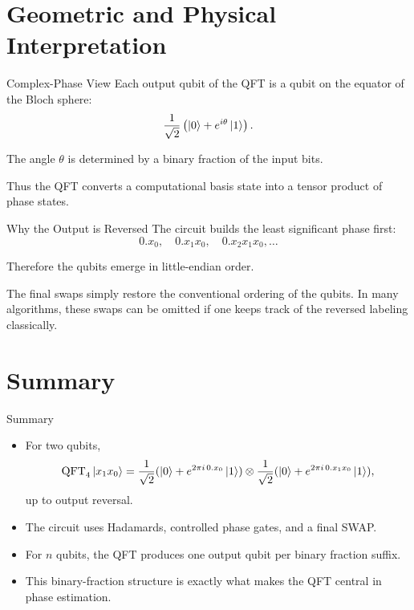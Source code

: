 \documentclass{beamer}
\begin{document}
\section{Geometric and Physical Interpretation}

\begin{frame}{Complex-Phase View}
Each output qubit of the QFT is a qubit on the equator of the Bloch sphere:
\[
\frac{1}{\sqrt{2}}
\left(
\ket{0}+e^{i\theta}\ket{1}
\right).
\]

The angle \(\theta\) is determined by a binary fraction of the input bits.

Thus the QFT converts a computational basis state into a tensor product of phase states.
\end{frame}


\begin{frame}{Why the Output is Reversed}
The circuit builds the least significant phase first:
\[
0.x_0,\quad 0.x_1x_0,\quad 0.x_2x_1x_0,\dots
\]

Therefore the qubits emerge in little-endian order.

The final swaps simply restore the conventional ordering of the qubits. In many algorithms, these swaps can be omitted if one keeps track of the reversed labeling classically.
\end{frame}

\section{Summary}

\begin{frame}{Summary}
\begin{itemize}
\item For two qubits,
\[
\mathrm{QFT}_4\ket{x_1x_0}
=
\frac{1}{\sqrt{2}}
(\ket{0}+e^{2\pi i\,0.x_0}\ket{1})
\otimes
\frac{1}{\sqrt{2}}
(\ket{0}+e^{2\pi i\,0.x_1x_0}\ket{1}),
\]
up to output reversal.
\item The circuit uses Hadamards, controlled phase gates, and a final SWAP.
\item For \(n\) qubits, the QFT produces one output qubit per binary fraction suffix.
\item This binary-fraction structure is exactly what makes the QFT central in phase estimation.
\end{itemize}
\end{frame}
\end{document}
